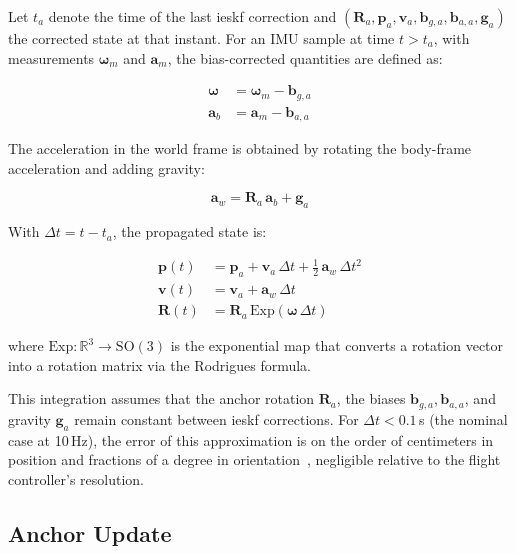 Let $t_a$ denote the time of the last \gls{ieskf} correction and
$(\mathbf{R}_a, \mathbf{p}_a, \mathbf{v}_a, \mathbf{b}_{g,a}, \mathbf{b}_{a,a},
\mathbf{g}_a)$ the corrected state at that instant. For an IMU sample at time
$t > t_a$, with measurements $\boldsymbol{\omega}_m$ and $\mathbf{a}_m$, the
bias-corrected quantities are defined as:

\begin{align}
    \boldsymbol{\omega} &= \boldsymbol{\omega}_m - \mathbf{b}_{g,a}
    \label{eq:fr-omega} \\
    \mathbf{a}_b &= \mathbf{a}_m - \mathbf{b}_{a,a}
    \label{eq:fr-abody}
\end{align}

The acceleration in the world frame is obtained by rotating the body-frame
acceleration and adding gravity:

\begin{equation}
    \mathbf{a}_w = \mathbf{R}_a \, \mathbf{a}_b + \mathbf{g}_a
    \label{eq:fr-aworld}
\end{equation}

With $\Delta t = t - t_a$, the propagated state is:

\begin{align}
    \mathbf{p}(t) &= \mathbf{p}_a + \mathbf{v}_a \, \Delta t
        + \tfrac{1}{2} \, \mathbf{a}_w \, \Delta t^2
    \label{eq:fr-prop-pos} \\
    \mathbf{v}(t) &= \mathbf{v}_a + \mathbf{a}_w \, \Delta t
    \label{eq:fr-prop-vel} \\
    \mathbf{R}(t) &= \mathbf{R}_a \, \mathrm{Exp}(\boldsymbol{\omega} \, \Delta t)
    \label{eq:fr-prop-rot}
\end{align}

where $\mathrm{Exp}: \mathbb{R}^3 \to \mathrm{SO}(3)$ is the exponential map that
converts a rotation vector into a rotation matrix via the Rodrigues formula.

\begin{remark}
This integration assumes that the anchor rotation $\mathbf{R}_a$, the biases
$\mathbf{b}_{g,a}, \mathbf{b}_{a,a}$, and gravity $\mathbf{g}_a$ remain constant
between \gls{ieskf} corrections. For $\Delta t < 0.1$\,s (the nominal case at
10\,Hz), the error of this approximation is on the order of centimeters in position
and fractions of a degree in orientation~\cite{sola2017quaternion}, negligible
relative to the flight controller's resolution.
\end{remark}

\subsection{Anchor Update}
\label{sec:fr-anchor}

